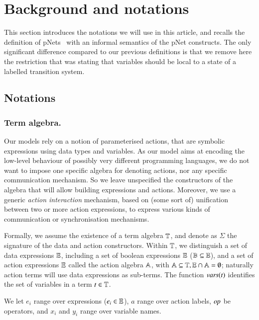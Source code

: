 \documentclass{elsarticle}
\newcommand{\TODO}[1]{\textcolor{red}{\textbf{[TODO:#1]}}}
\begin{document}
\section{Background and notations}\label{sec:notations}
This section introduces the notations we will use in this article, and  recalls the definition of pNets~\cite{henrio:Forte2016} with an informal semantics  of the pNet constructs. The only significant difference compared to our previous definitions is that we remove here the restriction that was stating that variables should be local to a state of a labelled transition system.




\subsection{Notations}
\subsubsection*{Term algebra.}
Our models rely on a notion of parameterised actions, that are
symbolic expressions using data types and variables. As our model aims
at encoding the low-level behaviour of possibly very different
programming languages, we do not want to impose one specific algebra
for denoting actions, nor any specific communication mechanism. So we
leave unspecified the constructors of the algebra that will allow building
expressions and actions. Moreover, we use a generic {\em action interaction}
mechanism, based on (some sort of) unification between two or more action
expressions, to express various kinds of communication or
synchronisation mechanisms.


Formally, we assume the existence of a term algebra $\mathbb{T}$,
and denote as $\Sigma$ the signature of the data and action constructors. Within $\mathbb{T}$, we distinguish a set of
data expressions $\mathbb{E}$, including a set of boolean
expressions $\mathbb{E}$ ($\mathbb{B}\subseteq\mathbb{E}$), 
and a set of action expressions $\mathbb{E}$ called the action algebra
$\mathbb{A}$, with $\mathbb{A}\subseteq\mathbb{T},
\mathbb{E}\cap\mathbb{A}=\emptyset$;
naturally action terms will use data expressions as sub-terms.
The function $\vars(t)$ identifies the set of variables in a term
$t\in\mathbb{T}$.

We let $e_i$ range over expressions ($e_i\in\mathbb{E}$), $a$
range over action labels, $\symb{op}$ be operators, and $x_i$ and $y_i$ range over
variable names. 
\end{document}
